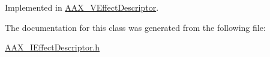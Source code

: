 Implemented in \mbox{\hyperlink{a01913_a4fcd7f20eb9fb8f7387a744a34ed83a5}{A\+A\+X\+\_\+\+V\+Effect\+Descriptor}}.



The documentation for this class was generated from the following file\+:\begin{DoxyCompactItemize}
\item 
\mbox{\hyperlink{a00590}{A\+A\+X\+\_\+\+I\+Effect\+Descriptor.\+h}}\end{DoxyCompactItemize}
